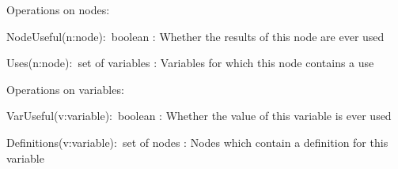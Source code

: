 Operations on nodes:
\begin{tightdesc}
\item[NodeUseful(n:node):~boolean]
:	Whether the results of this node are ever used
\item[Uses(n:node):~set of variables]
:	Variables for which this node contains a use
\end{tightdesc}

Operations on variables:
\begin{tightdesc}
\item[VarUseful(v:variable):~boolean]
:	Whether the value of this variable is ever used
\item[Definitions(v:variable):~set of nodes]
:	Nodes which contain a definition for this variable
\end{tightdesc}
